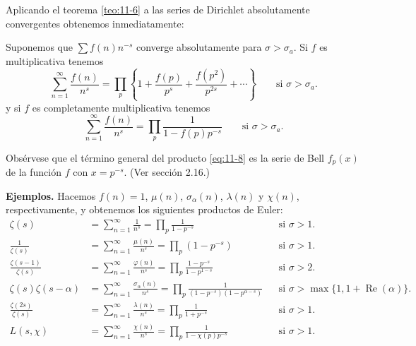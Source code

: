 \documentclass[12pt,a4paper]{book}
\begin{document}
    Aplicando el teorema \ref{teo:11-6} a las series de Dirichlet absolutamente convergentes
    obtenemos inmediatamente:

    \begin{teorema}\label{teo:11-7}
        Suponemos que $\sum f(n)n^{-s}$ converge absolutamente para $\sigma>\sigma_{a}$. Si $f$
        es multiplicativa tenemos
        \begin{equation}\label{eq:11-8}
            \sum_{n=1}^{\infty}\frac{f(n)}{n^{s}}=\prod_{p}\left\{1+\frac{f(p)}{p^{s}}+\frac{f(p^{2})}{p^{2s}}+\cdots\right\}\qquad\text{si }\sigma>\sigma_{a}.
        \end{equation}
        y si $f$ es completamente multiplicativa tenemos
        \begin{equation*}
            \sum_{n=1}^{\infty}\frac{f(n)}{n^{s}}=\prod_{p}\frac{1}{1-f(p)p^{-s}}\qquad\text{si }\sigma>\sigma_{a}.
        \end{equation*}
    \end{teorema}

    Obsérvese que el término general del producto \eqref{eq:11-8} es la serie de Bell
    $f_{p}(x)$ de la función $f$ con $x=p^{-s}$. (Ver sección 2.16.)

    \textbf{Ejemplos.} Hacemos $f(n)=1$, $\mu(n)$, $\sigma_{\alpha}(n)$, $\lambda(n)$ y
    $\chi(n)$, respectivamente, y obtenemos los siguientes productos de Euler:
    \begin{align*}
        \zeta(s)&=\sum_{n=1}^{\infty}\frac{1}{n^{s}}=\prod_{p}\frac{1}{1-p^{-s}}&&\text{si }\sigma>1.\\
        \frac{1}{\zeta(s)}&=\sum_{n=1}^{\infty}\frac{\mu(n)}{n^{s}}=\prod_{p}(1-p^{-s})&&\text{si }\sigma>1.\\
        \frac{\zeta(s-1)}{\zeta(s)}&=\sum_{n=1}^{\infty}\frac{\varphi(n)}{n^{s}}=\prod_{p}\frac{1-p^{-s}}{1-p^{1-s}}&&\text{si }\sigma>2.\\
        \zeta(s)\zeta(s-\alpha)&=\sum_{n=1}^{\infty}\frac{\sigma_{\alpha}(n)}{n^{s}}=\prod_{p}\frac{1}{(1-p^{-s})(1-p^{\alpha-s})}&&\text{si }\sigma>\max\{1,1+\operatorname{Re}(\alpha)\}.\\
        \frac{\zeta(2s)}{\zeta(s)}&=\sum_{n=1}^{\infty}\frac{\lambda(n)}{n^{s}}=\prod_{p}\frac{1}{1+p^{-s}}&&\text{si }\sigma>1.\\
        L(s,\chi)&=\sum_{n=1}^{\infty}\frac{\chi(n)}{n^{s}}=\prod_{p}\frac{1}{1-\chi(p)p^{-s}}&&\text{si }\sigma>1.
    \end{align*}
\end{document}
